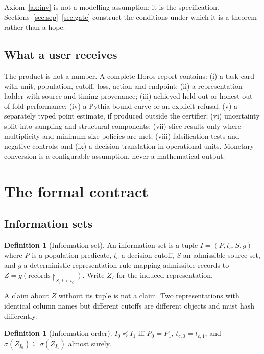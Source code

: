 \documentclass[11pt,a4paper]{article}
\theoremstyle{definition}
\newtheorem{definition}[theorem]{Definition}
\theoremstyle{remark}
\begin{document}
Axiom~\ref{ax:inv} is not a modelling assumption; it is the specification. Sections~\ref{sec:sep}--\ref{sec:gate} construct the conditions under which it is a theorem rather than a hope.

\subsection{What a user receives}

The product is not a number. A complete Horos report contains: (i) a task card with unit, population, cutoff, loss, action and endpoint; (ii) a representation ladder with source and timing provenance; (iii) achieved held-out or honest out-of-fold performance; (iv) a Pythia bound curve or an explicit refusal; (v) a separately typed point estimate, if produced outside the certifier; (vi) uncertainty split into sampling and structural components; (vii) slice results only where multiplicity and minimum-size policies are met; (viii) falsification tests and negative controls; and (ix) a decision translation in operational units. Monetary conversion is a configurable assumption, never a mathematical output.

\section{The formal contract}\label{sec:contract}

\subsection{Information sets}

\begin{definition}[Information set]\label{def:infoset}
An information set is a tuple $I=(P,t_c,S,g)$ where $P$ is a population predicate, $t_c$ a decision cutoff, $S$ an admissible source set, and $g$ a deterministic representation rule mapping admissible records to $Z=g(\text{records}\!\restriction_{S,\,t<t_c})$. Write $Z_I$ for the induced representation.
\end{definition}

A claim about $Z$ without its tuple is not a claim. Two representations with identical column names but different cutoffs are different objects and must hash differently.

\begin{definition}[Information order]\label{def:order}
$I_0\preceq I_1$ iff $P_0=P_1$, $t_{c,0}=t_{c,1}$, and $\sigma(Z_{I_0})\subseteq\sigma(Z_{I_1})$ almost surely.
\end{definition}
\end{document}
